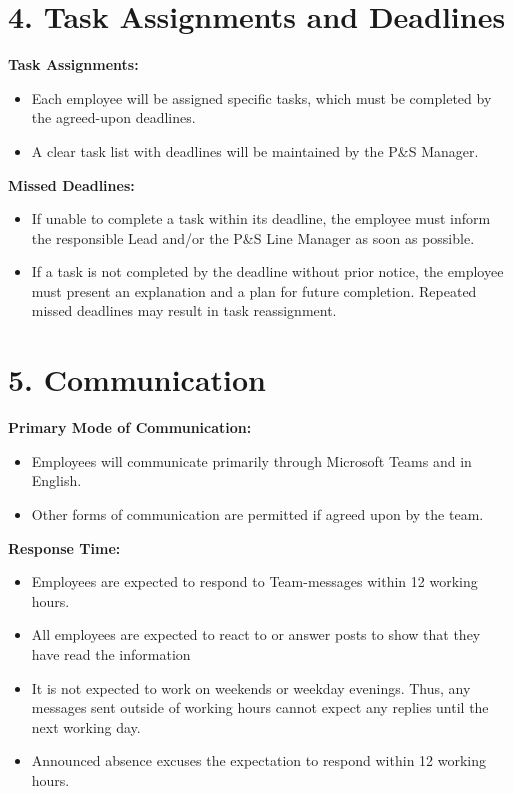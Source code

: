 \documentclass[a4paper,12pt]{article}
\begin{document}
\vspace{1em}

\section*{4. Task Assignments and Deadlines}
\vspace{0.5em} 

\textbf{Task Assignments:}
\begin{itemize}[leftmargin=2em]
    \item Each employee will be assigned specific tasks, which must be completed by the agreed-upon deadlines. 
    \item A clear task list with deadlines will be maintained by the P\&S Manager.
\end{itemize}

\noindent\textbf{Missed Deadlines:}
\begin{itemize}[leftmargin=2em]
    \item If unable to complete a task within its deadline, the employee must inform the responsible Lead and/or the P\&S Line Manager as soon as possible.
    \item If a task is not completed by the deadline without prior notice, the employee must present an explanation and a plan for future completion. Repeated missed deadlines may result in task reassignment.
\end{itemize}

\vspace{1em}

\section*{5. Communication}
\vspace{0.5em} 

\textbf{Primary Mode of Communication:} 
\begin{itemize}[leftmargin=2em]
    \item Employees will communicate primarily through Microsoft Teams and in English.
    \item Other forms of communication are permitted if agreed upon by the team.
\end{itemize}

\noindent\textbf{Response Time:} 
\begin{itemize}[leftmargin=2em]
    \item Employees are expected to respond to Team-messages within 12 working hours.
    \item All employees are expected to react to or answer posts to show that they have read the information
    \item It is not expected to work on weekends or weekday evenings. Thus, any messages sent outside of working hours cannot expect any replies until the next working day. 
    \item Announced absence excuses the expectation to respond within 12 working hours. 
\end{itemize}
\end{document}
